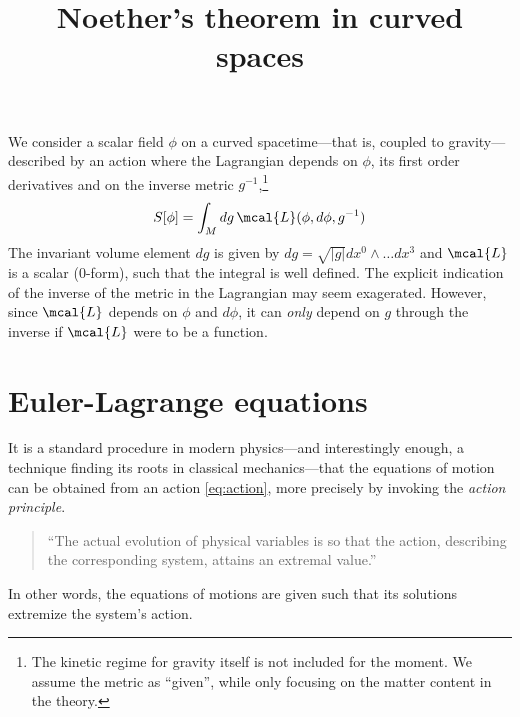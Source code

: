 \documentclass[11pt]{article}
\author{}
\title{Noether's theorem in curved spaces}
\date{}
\begin{document}
\maketitle

We consider a scalar field $\phi$ on a curved spacetime---that 
is, coupled to gravity---described by an action where the 
Lagrangian depends on $\phi$, its first order derivatives and on 
the inverse metric $g^{-1}$,\footnote{The kinetic regime for 
	gravity itself is not included for the moment. We assume the 
	metric as ``given'', while only focusing on the matter content 
	in the theory.}
%
\begin{equation}\label{eq:action}
	S[\phi] = \int_M dg\,\mcal{L}(\phi,d\phi,g^{-1})
\end{equation}
The invariant volume element $dg$ is given by $dg = 
\sqrt{|g|}dx^0\wedge \ldots dx^3$ and $\mcal{L}$ is a scalar 
($0$-form), such that the integral is well defined. The explicit 
indication of the inverse of the metric in the Lagrangian may 
seem exagerated. However, since $\mcal{L}$ depends on $\phi$ and 
$d\phi$, it can \emph{only} depend on $g$ through the inverse if 
$\mcal{L}$ were to be a function.

\section{Euler-Lagrange equations}

It is a standard procedure in modern physics---and interestingly 
enough, a technique finding its roots in classical 
mechanics---that the equations of motion can be obtained from an 
action \eqref{eq:action}, more precisely by invoking the 
\emph{action principle}.
\begin{quote}
	``The actual evolution of physical variables is so that the 
	action, describing the corresponding system, attains an 
	extremal value.''
\end{quote}
In other words, the equations of motions are given such that its 
solutions extremize the system's action.
\end{document}
